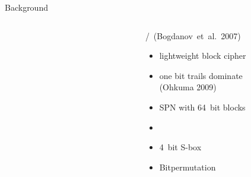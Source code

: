 \begin{columns}[t]
\begin{column}{\twocolwid}
\begin{alertblock}{Background}
\begin{columns}[t]
\begin{column}{\smallonecolwid}
	\end{column}
	\begin{column}{\smallsepwid}\end{column}\begin{column}{\smallonecolwid}

	\begin{block}{\present/~(Bogdanov~et~al.\ 2007)}
		\begin{minipage}{0.329\smallonecolwid}
			\begin{itemize}
				\item lightweight block cipher
				\item one bit trails dominate\\(Ohkuma 2009)
			\end{itemize}
		\end{minipage}
		\hspace*{15mm}
		\begin{minipage}{0.32\smallonecolwid}
			\begin{itemize}
				\item SPN with 64~bit blocks
				\item[] \vphantom{empty line}
			\end{itemize}
		\end{minipage}
		\hspace*{15mm}
		\begin{minipage}{0.225\smallonecolwid}
			\begin{itemize}
				\item 4~bit S-box
				\item Bitpermutation\\\vphantom{empty line}
			\end{itemize}
		\end{minipage}
	\end{block}

	\end{column}
	\end{columns}

\end{alertblock}

\end{column}
\end{columns}



